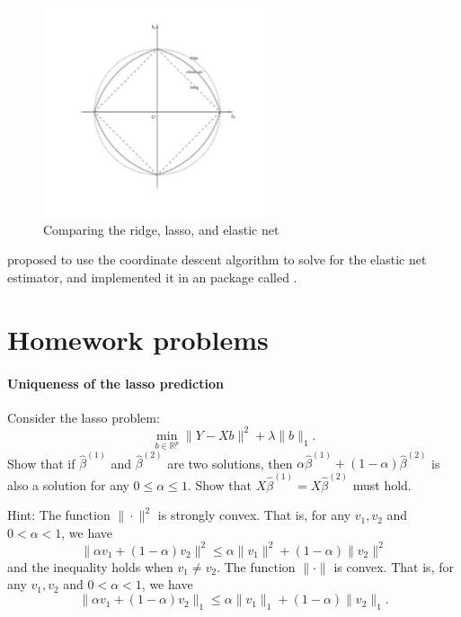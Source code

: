 \begin{figure}
\centering
\includegraphics[width = 0.6\textwidth]{figures/elasticnetpenalty.pdf}
\caption{Comparing the ridge, lasso, and elastic net}
\label{fig::elasticnet-penalty}
\end{figure}



\citet{friedman2007pathwise} proposed to use the coordinate descent algorithm to solve for the elastic net estimator, and \citet{friedman2009glmnet} implemented it in an  package called . 

 
 
 
\section{Homework problems}


\paragraph{Uniqueness of the lasso prediction}\label{hw14::uniqueness-lasso-pred}


Consider the lasso problem: 
$$
\min_{b\in\mathbb{R}^{p}}   \|Y-Xb\|^{2}+\lambda\|b\|_{1} . 
$$
Show that if $\hat{\beta}^{(1)}$ and $\hat{\beta}^{(2)}$ are two solutions, then $ \alpha  \hat{\beta}^{(1)} + (1-\alpha)  \hat{\beta}^{(2)}$ is also a solution for any $0\leq  \alpha  \leq 1$. Show that $X \hat{\beta}^{(1)} = X\hat{\beta}^{(2)}$ must hold. 


Hint: The function $\| \cdot \|^2$ is strongly convex. That is, for any $v_1, v_2$ and $ 0< \alpha < 1$, we have
$$
\|   \alpha  v_1  +(1-\alpha ) v_2     \|^2 \leq \alpha \| v_1 \|^2 + (1- \alpha ) \| v_2 \|^2
$$
and the inequality holds when $v_1 \neq v_2$.  The function $\|\cdot \|$ is convex. That is, for any $v_1, v_2$ and $ 0< \alpha < 1$, we have
$$
\|   \alpha  v_1  +(1-\alpha ) v_2     \|_1 \leq \alpha \| v_1 \|_1 + (1- \alpha ) \| v_2 \|_1.
$$

